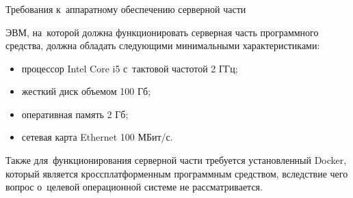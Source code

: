 \subsubsection{} Требования к~аппаратному обеспечению серверной части
\label{sec:analysis:research:req:server_requirments}

ЭВМ, на~которой должна функционировать серверная часть программного средства, должна обладать следующими минимальными характеристиками:

\begin{itemize}
	\item процессор Intel Core i5 с~тактовой частотой 2 ГГц;
	\item жесткий диск объемом 100 Гб;
	\item оперативная память 2 Гб;
	\item сетевая карта Ethernet 100 МБит/с.
\end{itemize}

Также для~функционирования серверной части требуется установленный Docker, который является кроссплатформенным программным средством, вследствие чего вопрос о~целевой операционной системе не рассматривается.